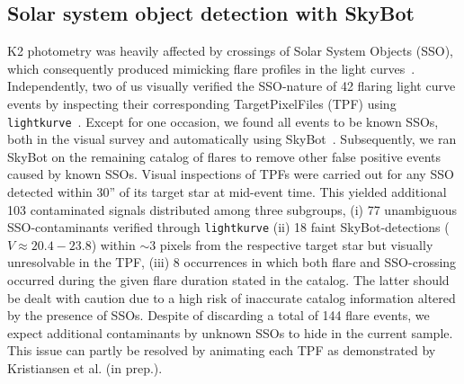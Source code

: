 \documentclass{aa}
\begin{document}
\begin{appendix}
\section{Solar system object detection with SkyBot}
\label{app:skybot}
K2 photometry was heavily affected by crossings of Solar System Objects (SSO), which consequently produced mimicking flare profiles in the light curves~\citep{szabo2015}. Independently, two of us visually verified the SSO-nature of 42 flaring light curve events by inspecting their corresponding TargetPixelFiles (TPF) using \texttt{lightkurve}~\citep{lightkurve2018}. Except for one occasion, we found all events to be known SSOs, both in the visual survey and automatically using SkyBot~\citep{berthier2016}. Subsequently, we ran SkyBot on the remaining catalog of flares to remove other false positive events caused by known SSOs. Visual inspections of TPFs were carried out for any SSO detected within 30'' of its target star at mid-event time. This yielded additional 103 contaminated signals distributed among three subgroups, (i) 77 unambiguous SSO-contaminants verified through \texttt{lightkurve} (ii) 18 faint SkyBot-detections ($V\approx 20.4-23.8$) within $\sim3$ pixels from the respective target star but visually unresolvable in the TPF, (iii) 8 occurrences in which both flare and SSO-crossing occurred during the given flare duration stated in the catalog. The latter should be dealt with caution due to a high risk of inaccurate catalog information altered by the presence of SSOs. Despite of discarding a total of 144 flare events, we expect additional contaminants by unknown SSOs to hide in the current sample. This issue can partly be resolved by animating each TPF as demonstrated by Kristiansen et al. (in prep.). 

\end{appendix}
\end{document}
